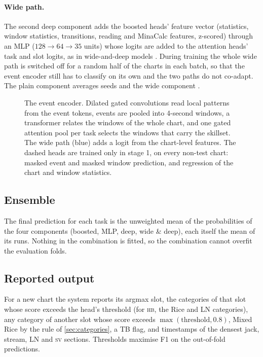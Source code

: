 \documentclass[10pt,twocolumn]{article}
\newcommand{\HB}{\textsc{hb}}
\newcommand{\SV}{\textsc{sv}}
\begin{document}
\paragraph{Wide path.} The second deep component adds the boosted heads' feature vector (statistics, window statistics, transitions, reading and MinaCalc features, z-scored) through an MLP ($128\to64\to35$ units) whose logits are added to the attention heads' task and slot logits, as in wide-and-deep models \citep{cheng2016wide}. During training the whole wide path is switched off for a random half of the charts in each batch, so that the event encoder still has to classify on its own and the two paths do not co-adapt. The plain component averages \nPlain{} seeds and the wide component \nWide{}.

\begin{figure}[t]
\centering
\resizebox{\textwidth}{!}{}
\caption{The event encoder. Dilated gated convolutions read local patterns from the event tokens, events are pooled into 4-second windows, a transformer relates the windows of the whole chart, and one gated attention pool per task selects the windows that carry the skillset. The wide path (blue) adds a logit from the chart-level features. The dashed heads are trained only in stage 1, on every non-test chart: masked event and masked window prediction, and regression of the chart and window statistics.}
\label{fig:encoder}
\end{figure}

\subsection{Ensemble}\label{sec:ensemble}
The final prediction for each task is the unweighted mean of the probabilities of the four components (boosted, MLP, deep, wide \& deep), each itself the mean of its runs. Nothing in the combination is fitted, so the combination cannot overfit the evaluation folds.

\subsection{Reported output}
For a new chart the system reports its argmax slot, the categories of that slot whose score exceeds the head's threshold (for \HB, the Rice and LN categories), any category of another slot whose score exceeds $\max(\text{threshold},0.8)$, Mixed Rice by the rule of \cref{sec:categories}, a TB flag, and timestamps of the densest jack, stream, LN and \SV{} sections. Thresholds maximise F1 on the out-of-fold predictions.
\end{document}
